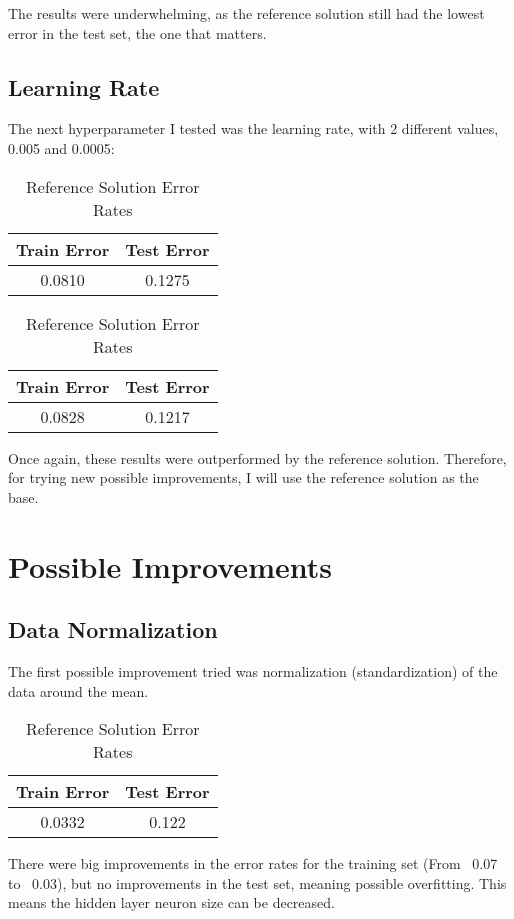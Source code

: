 \documentclass[
  a4paper,            %
  DIV=10,             %
  oneside,            %
  BCOR=5mm,           %
  parskip=half,       %
  numbers=noenddot,   %
  bibtotoc,           %
  listof=totoc,        %
  article
]{scrreprt}
\begin{document}
The results were underwhelming, as the reference solution still had the lowest error in the test set, the one that matters.
\subsection{Learning Rate}
The next hyperparameter I tested was the learning rate, with 2 different values, 0.005 and 0.0005:
\begin{table}[h!]
  \centering
  \begin{tabular}{|c|c|}
  \hline
  \textbf{Train Error} & \textbf{Test Error} \\
  \hline
  0.0810 & 0.1275 \\
  \hline
  \end{tabular}
  \caption*{Reference Solution Error Rates}
  \end{table}
\begin{table}[h!]
  \centering
  \begin{tabular}{|c|c|}
  \hline
  \textbf{Train Error} & \textbf{Test Error} \\
  \hline
  0.0828 & 0.1217 \\
  \hline
  \end{tabular}
  \caption*{Reference Solution Error Rates}
  \end{table}

Once again, these results were outperformed by the reference solution.
Therefore, for trying new possible improvements, I will use the reference solution as the base.

\section{Possible Improvements}
\subsection{Data Normalization}
The first possible improvement tried was normalization (standardization) of the data around the mean.
\begin{table}[h!]
  \centering
  \begin{tabular}{|c|c|}
  \hline
  \textbf{Train Error} & \textbf{Test Error} \\
  \hline
  0.0332 & 0.122 \\
  \hline
  \end{tabular}
  \caption*{Reference Solution Error Rates}
  \end{table}
There were big improvements in the error rates for the training set (From ~0.07 to ~0.03), but no improvements in the test set, meaning possible overfitting.
This means the hidden layer neuron size can be decreased.
\end{document}
